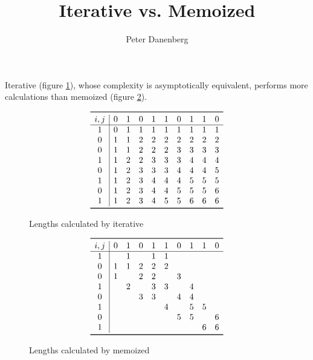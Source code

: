 \documentclass{article}
\title{Iterative vs. Memoized \proc{LCS-Length}}
\author{Peter Danenberg}
\begin{document}
\maketitle

Iterative  (figure \ref{fig:iter}), whose complexity
is asymptotically equivalent, performs more calculations than memoized
 (figure \ref{fig:memo}).
\begin{figure}[ht]
  \[
    \begin{array}{c|ccccccccc}
      \toprule i, j
      & 0 & 1 & 0 & 1 & 1 & 0 & 1 & 1 & 0\\
      \hline
      1 & 0 & 1 & 1 & 1 & 1 & 1 & 1 & 1 & 1\\
      0 & 1 & 1 & 2 & 2 & 2 & 2 & 2 & 2 & 2\\
      0 & 1 & 1 & 2 & 2 & 2 & 3 & 3 & 3 & 3\\
      1 & 1 & 2 & 2 & 3 & 3 & 3 & 4 & 4 & 4\\
      0 & 1 & 2 & 3 & 3 & 3 & 4 & 4 & 4 & 5\\
      1 & 1 & 2 & 3 & 4 & 4 & 4 & 5 & 5 & 5\\
      0 & 1 & 2 & 3 & 4 & 4 & 5 & 5 & 5 & 6\\
      1 & 1 & 2 & 3 & 4 & 5 & 5 & 6 & 6 & 6\\
      \bottomrule
    \end{array}
    \]
  \caption{Lengths calculated by iterative }
  \label{fig:iter}
\end{figure}
\begin{figure}[ht]
  \[
    \begin{array}{c|cccccccccc}
      \toprule i, j
      & 0 & 1 & 0 & 1 & 1 & 0 & 1 & 1 & 0\\
      \hline
      1 & \, & 1 & \, & 1 & 1 & \, & \, & \, & \,\\
      0 & 1 & 1 & 2 & 2 & 2 & \, & \, & \, & \,\\
      0 & 1 & \, & 2 & 2 & \, & 3 & \, & \, & \,\\
      1 & \, & 2 & \, & 3 & 3 & \, & 4 & \, & \,\\
      0 & \, & \, & 3 & 3 & \, & 4 & 4 & \, & \,\\
      1 & \, & \, & \, & \, & 4 & \, & 5 & 5 & \,\\
      0 & \, & \, & \, & \, & \, & 5 & 5 & \, & 6\\
      1 & \, & \, & \, & \, & \, & \, & \, & 6 & 6\\
      \bottomrule
    \end{array}
    \]
  \caption{Lengths calculated by memoized }
  \label{fig:memo}
\end{figure}
\end{document}
